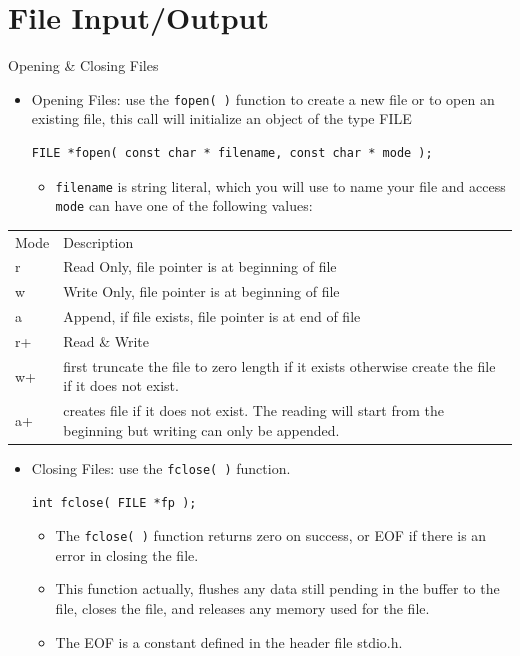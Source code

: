 \documentclass[10pt,t]{beamer}
\begin{document}
\section{File Input/Output}
\begin{frame}[fragile]{Opening \& Closing Files}
  \begin{itemize}
  \item Opening Files: use the \lstinline[basicstyle=\scriptsize\ttfamily]|fopen( )| function to create a new file or to open an existing file, this call will initialize an object of the type FILE
    \begin{lstlisting}[basicstyle=\scriptsize\ttfamily]
      FILE *fopen( const char * filename, const char * mode );
    \end{lstlisting}
    \begin{itemize}
    \item  \lstinline[basicstyle=\scriptsize\ttfamily]|filename| is string literal, which you will use to name your file and access  \lstinline[basicstyle=\scriptsize\ttfamily]|mode| can have one of the following values:
    \end{itemize}
  \end{itemize}
  {\scriptsize
  \begin{tabular}{af}
    Mode & Description \\
    r & Read Only, file pointer is at beginning of file \\
    w & Write Only, file pointer is at beginning of file \\
    a & Append, if file exists, file pointer is at end of file \\
    r+ & Read \& Write \\
    w+ & first truncate the file to zero length if it exists otherwise create the file if it does not exist. \\
    a+ & creates file if it does not exist. The reading will start from the beginning but writing can only be appended. \\
  \end{tabular}
  }
  \begin{itemize}
  \item Closing Files: use the \lstinline[basicstyle=\scriptsize\ttfamily]|fclose( )| function.
    \begin{lstlisting}[basicstyle=\scriptsize\ttfamily]
      int fclose( FILE *fp );
    \end{lstlisting}
    \begin{itemize}
    \item The \lstinline[basicstyle=\scriptsize\ttfamily]|fclose( )| function returns zero on success, or EOF if there is an error in closing the file.
    \item This function actually, flushes any data still pending in the buffer to the file, closes the file, and releases any memory used for the file.
    \item The EOF is a constant defined in the header file stdio.h.
    \end{itemize}
  \end{itemize}
\end{frame}
\end{document}
